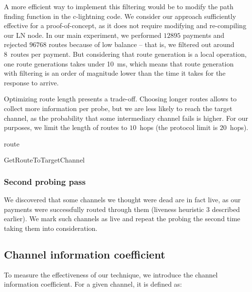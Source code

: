 A more efficient way to implement this filtering would be to modify the path finding function in the c-lightning code.
We consider our approach sufficiently effective for a proof-of-concept, as it does not require modifying and re-compiling our LN node.
In our main experiment, we performed $12895$ payments and rejected $96768$ routes because of low balance -- that is, we filtered out around 8~routes per payment.
But considering that route generation is a local operation, one route generations takes under 10~ms, which means that route generation with filtering is an order of magnitude lower than the time it takes for the response to arrive.

Optimizing route length presents a trade-off.
Choosing longer routes allows to collect more information per probe, but we are less likely to reach the target channel, as the probability that some intermediary channel fails is higher.
For our purposes, we limit the length of routes to $10$~hops (the protocol limit is $20$~hops).

\begin{algorithm}
	 {
	}
	\Return route\;
	\caption{GetRouteToTargetChannel}
	\label{alg:find-route}
\end{algorithm}

\subsubsection{Second probing pass}
We discovered that some channels we thought were dead are in fact live, as our payments were successfully routed through them (liveness heuristic 3 described earlier).
We mark such channels as live and repeat the probing the second time taking them into consideration.

\subsection{Channel information coefficient}
To measure the effectiveness of our technique, we introduce the channel information coefficient.
For a given channel, it is defined as:

